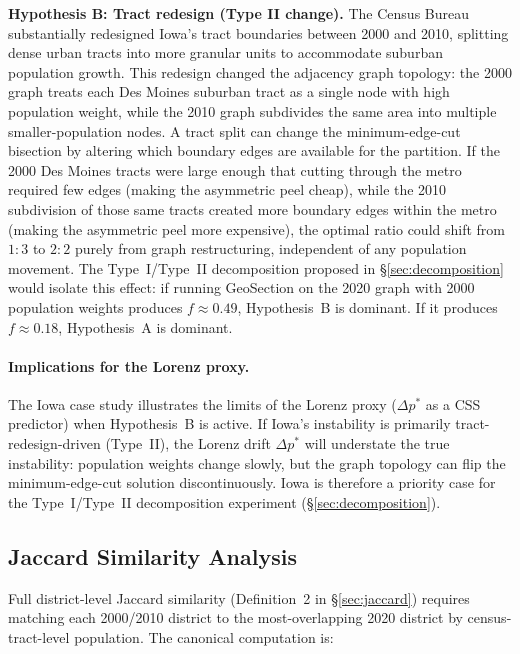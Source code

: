 \textbf{Hypothesis B: Tract redesign (Type II change).}
The Census Bureau substantially redesigned Iowa's tract boundaries between 2000
and 2010, splitting dense urban tracts into more granular units to accommodate
suburban population growth.
This redesign changed the adjacency graph topology: the 2000 graph treats
each Des Moines suburban tract as a single node with high population weight,
while the 2010 graph subdivides the same area into multiple smaller-population
nodes.
A tract split can change the minimum-edge-cut bisection by altering which
boundary edges are available for the partition.
If the 2000 Des Moines tracts were large enough that cutting through the
metro required few edges (making the asymmetric peel cheap), while the 2010
subdivision of those same tracts created more boundary edges within the metro
(making the asymmetric peel more expensive), the optimal ratio could shift
from $1:3$ to $2:2$ purely from graph restructuring, independent of any
population movement.
The Type~I/Type~II decomposition proposed in \S\ref{sec:decomposition}
would isolate this effect: if running GeoSection on the 2020 graph with
2000 population weights produces $f \approx 0.49$, Hypothesis~B is dominant.
If it produces $f \approx 0.18$, Hypothesis~A is dominant.

\paragraph{Implications for the Lorenz proxy.}
The Iowa case study illustrates the limits of the Lorenz proxy
($\Delta p^*$ as a CSS predictor) when Hypothesis~B is active.
If Iowa's instability is primarily tract-redesign-driven (Type~II), the
Lorenz drift $\Delta p^*$ will understate the true instability: population
weights change slowly, but the graph topology can flip the minimum-edge-cut
solution discontinuously.
Iowa is therefore a priority case for the Type~I/Type~II decomposition
experiment (\S\ref{sec:decomposition}).

\subsection{Jaccard Similarity Analysis}
\label{sec:jaccard-analysis}

Full district-level Jaccard similarity (Definition~2 in \S\ref{sec:jaccard})
requires matching each 2000/2010 district to the most-overlapping 2020 district
by census-tract-level population.
The canonical computation is:

